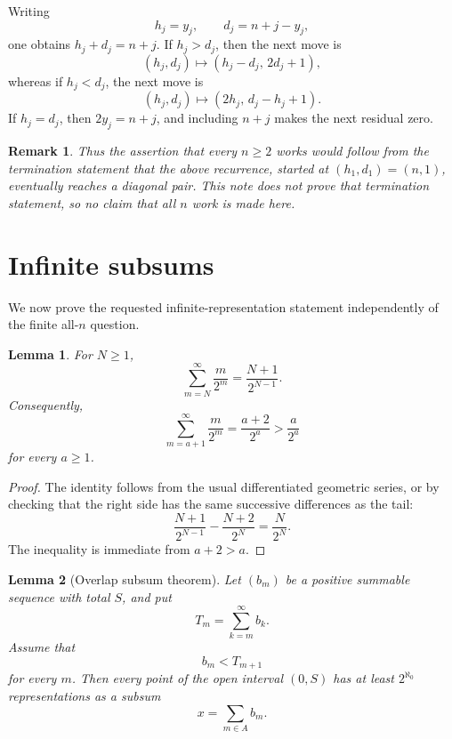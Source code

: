 \documentclass[a4paper,11pt]{amsart}
\newtheorem{lemma}{Lemma}
\newtheorem{remark}{Remark}
\begin{document}
Writing
\[
        h_j=y_j,\qquad d_j=n+j-y_j,
\]
one obtains \(h_j+d_j=n+j\).  If \(h_j>d_j\), then the next move is
\[
        (h_j,d_j)\mapsto (h_j-d_j,\,2d_j+1),
\]
whereas if \(h_j<d_j\), the next move is
\[
        (h_j,d_j)\mapsto (2h_j,\,d_j-h_j+1).
\]
If \(h_j=d_j\), then \(2y_j=n+j\), and including \(n+j\) makes the next
residual zero.

\begin{remark}
Thus the assertion that every \(n\geq 2\) works would follow from the
termination statement that the above recurrence, started at \((h_1,d_1)=(n,1)\),
eventually reaches a diagonal pair.  This note does not prove that termination
statement, so no claim that all \(n\) work is made here.
\end{remark}

\section{Infinite subsums}

We now prove the requested infinite-representation statement independently of
the finite all-\(n\) question.

\begin{lemma}
\label{tail}
For \(N\geq 1\),
\[
        \sum_{m=N}^{\infty}\frac m{2^m}
        =
        \frac{N+1}{2^{N-1}}.
\]
Consequently,
\[
        \sum_{m=a+1}^{\infty}\frac m{2^m}
        =
        \frac{a+2}{2^a}
        >
        \frac a{2^a}
\]
for every \(a\geq 1\).
\end{lemma}

\begin{proof}
The identity follows from the usual differentiated geometric series, or by
checking that the right side has the same successive differences as the tail:
\[
        \frac{N+1}{2^{N-1}}-\frac{N+2}{2^N}
        =
        \frac N{2^N}.
\]
The inequality is immediate from \(a+2>a\).
\end{proof}

\begin{lemma}[Overlap subsum theorem]
\label{overlap}
Let \((b_m)\) be a positive summable sequence with total \(S\), and put
\[
        T_m=\sum_{k=m}^{\infty}b_k.
\]
Assume that
\[
        b_m<T_{m+1}
\]
for every \(m\).  Then every point of the open interval \((0,S)\) has at least
\(2^{\aleph_0}\) representations as a subsum
\[
        x=\sum_{m\in A}b_m.
\]
\end{lemma}
\end{document}
